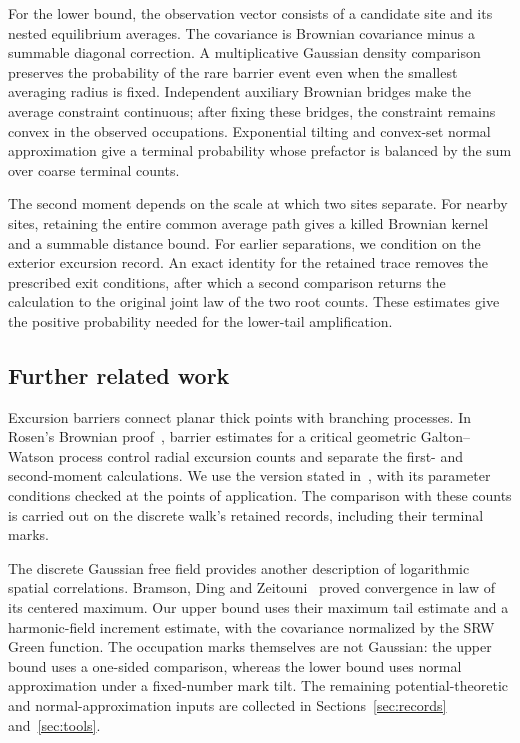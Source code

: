 \documentclass[11pt,letterpaper,reqno]{amsart}
\numberwithin{equation}{section}
\theoremstyle{remark}
\begin{document}
For the lower bound, the observation vector consists of a candidate site and its nested equilibrium averages. The covariance is Brownian covariance minus a summable diagonal correction. A multiplicative Gaussian density comparison preserves the probability of the rare barrier event even when the smallest averaging radius is fixed. Independent auxiliary Brownian bridges make the average constraint continuous; after fixing these bridges, the constraint remains convex in the observed occupations. Exponential tilting and convex-set normal approximation give a terminal probability whose prefactor is balanced by the sum over coarse terminal counts.

The second moment depends on the scale at which two sites separate. For nearby sites, retaining the entire common average path gives a killed Brownian kernel and a summable distance bound. For earlier separations, we condition on the exterior excursion record. An exact identity for the retained trace removes the prescribed exit conditions, after which a second comparison returns the calculation to the original joint law of the two root counts. These estimates give the positive probability needed for the lower-tail amplification.

\subsection{Further related work}\label{sec:related}
Excursion barriers connect planar thick points with branching processes. In Rosen's Brownian proof~\cite{GW}, barrier estimates for a critical geometric Galton--Watson process control radial excursion counts and separate the first- and second-moment calculations. We use the version stated in~\cite[Theorem 9.1]{GW}, with its parameter conditions checked at the points of application. The comparison with these counts is carried out on the discrete walk's retained records, including their terminal marks.

The discrete Gaussian free field provides another description of logarithmic spatial correlations. Bramson, Ding and Zeitouni~\cite{BDZ} proved convergence in law of its centered maximum. Our upper bound uses their maximum tail estimate and a harmonic-field increment estimate, with the covariance normalized by the SRW Green function. The occupation marks themselves are not Gaussian: the upper bound uses a one-sided comparison, whereas the lower bound uses normal approximation under a fixed-number mark tilt. The remaining potential-theoretic and normal-approximation inputs are collected in Sections~\ref{sec:records} and~\ref{sec:tools}.
\end{document}
